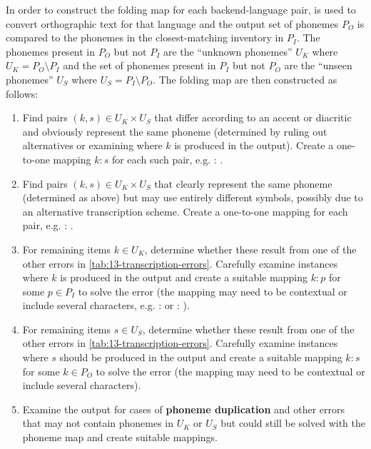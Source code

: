In order to construct the folding map for each backend-language pair, \gpp is used to convert orthographic text for that language and the output set of phonemes $P_O$ is compared to the phonemes in the closest-matching inventory in \phoible $P_I$. The phonemes present in $P_O$ but not $P_I$ are the ``unknown phonemes'' $U_K$ where $U_K = P_O \setminus P_I $ and the set of phonemes present in $P_I$ but not $P_O$ are the ``unseen phonemes'' $U_S$ where $U_S = P_I \setminus P_O $. The folding map are then constructed as follows:
\begin{enumerate}
    \item Find pairs $(k,s) \in U_K \times U_S$ that differ according to an accent or diacritic and obviously represent the same phoneme (determined by ruling out alternatives or examining where $k$ is produced in the output). Create a one-to-one mapping $k:s$ for each such pair, e.g.  : .
    \item Find pairs $(k,s) \in U_K \times U_S$ that clearly represent the same phoneme (determined as above) but may use entirely different symbols, possibly due to an alternative transcription scheme. Create a one-to-one mapping for each pair, e.g.  : \ttipa{\ae}.
    \item For remaining items $k \in U_K$, determine whether these result from one of the other errors in \cref{tab:13-transcription-errors}. Carefully examine instances where $k$ is produced in the output and create a suitable mapping $k : p$ for some $p \in P_I$ to solve the error (the mapping may need to be contextual or include several characters, e.g. \ttipa{\textrhookschwa} :  or  : ). 
    \item For remaining items $s \in U_S$, determine whether these result from one of the other errors in \cref{tab:13-transcription-errors}. Carefully examine instances where $s$ should be produced in the output and create a suitable mapping $k : s$ for some $k \in P_O$ to solve the error (the mapping may need to be contextual or include several characters). 
    \item Examine the output for cases of \textbf{phoneme duplication} and other errors that may not contain phonemes in $U_K$ or $U_S$ but could still be solved with the phoneme map and create suitable mappings.
\end{enumerate}

